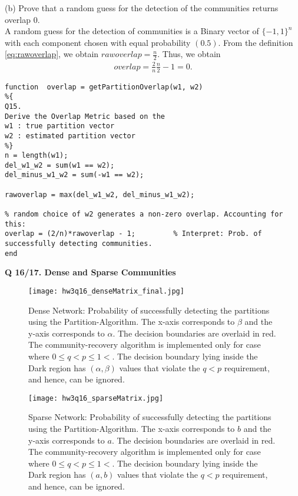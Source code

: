 \documentclass[9pt]{article}
\begin{document}
(b) Prove that a random guess for the detection of the communities returns overlap 0.\\
A random guess for the detection of communities is a Binary vector of $\{-1,1\}^n$ with each component chosen with equal probability $(0.5)$. From the definition \eqref{eq:rawoverlap}, we obtain $rawoverlap = \frac{n}{2}$. Thus, we obtain
\begin{align*}
overlap = \frac{2}{n}\frac{n}{2}  - 1 = 0.
\end{align*}

\begin{lstlisting}
function  overlap = getPartitionOverlap(w1, w2)
%{
Q15. 
Derive the Overlap Metric based on the 
w1 : true partition vector
w2 : estimated partition vector
%}
n = length(w1);
del_w1_w2 = sum(w1 == w2);
del_minus_w1_w2 = sum(-w1 == w2);

rawoverlap = max(del_w1_w2, del_minus_w1_w2);

% random choice of w2 generates a non-zero overlap. Accounting for this:
overlap = (2/n)*rawoverlap - 1;         % Interpret: Prob. of successfully detecting communities.
end

\end{lstlisting}

\hrulefill


\textbf{Q 16/17. Dense and Sparse Communities}



\begin{figure}[h!]
\centering
\texttt{[image: hw3q16\_denseMatrix\_final.jpg]}\\
\caption{Dense Network: Probability of successfully detecting the partitions using the Partition-Algorithm. The x-axis corresponds to $\beta$ and the y-axis corresponds to $\alpha$. The decision boundaries are overlaid in red. The community-recovery algorithm is implemented only for case where $0\leq q<p \leq 1<$. The decision boundary lying inside the Dark region has $(\alpha,\beta)$ values that violate the $q<p$ requirement, and hence, can be ignored. }
\label{fig:DenseNetwork}
\end{figure}




\begin{figure}[h!]
\centering
\texttt{[image: hw3q16\_sparseMatrix.jpg]}\\
\caption{Sparse Network: Probability of successfully detecting the partitions using the Partition-Algorithm. The x-axis corresponds to $b$ and the y-axis corresponds to $a$. The decision boundaries are overlaid in red. The community-recovery algorithm is implemented only for case where $0\leq q<p \leq 1<$. The decision boundary lying inside the Dark region has $(a,b)$ values that violate the $q<p$ requirement, and hence, can be ignored. }
\label{fig:SparseNetwork}
\end{figure}
\end{document}
